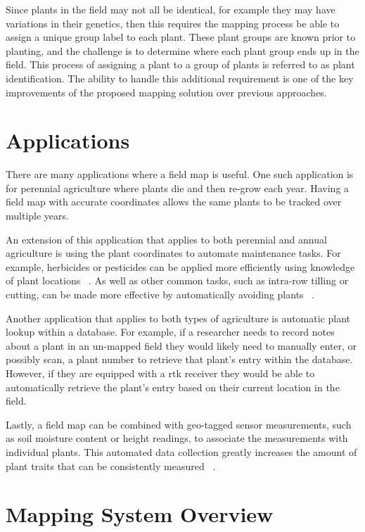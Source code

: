 Since plants in the field may not all be identical, for example they may have variations in their genetics, then this requires the mapping process be able to assign a unique group label to each plant.  These plant groups are known prior to planting, and the challenge is to determine where each plant group ends up in the field.  This process of assigning a plant to a group of plants is referred to as plant identification. The ability to handle this additional requirement is one of the key improvements of the proposed mapping solution over previous approaches.

\section{Applications}

There are many applications where a field map is useful.  One such application is for perennial agriculture where plants die and then re-grow each year.  Having a field map with accurate coordinates allows the same plants to be tracked over multiple years.

An extension of this application that applies to both perennial and annual agriculture is using the plant coordinates to automate maintenance tasks.  For example, herbicides or pesticides can be applied more efficiently using knowledge of plant locations ~\citep{Carballido:2013}. As well as other common tasks, such as intra-row tilling or cutting, can be made more effective by automatically avoiding plants ~\citep{Bakker:2010}.  

Another application that applies to both types of agriculture is automatic plant lookup within a database.  For example, if a researcher needs to record notes about a plant in an un-mapped field they would likely need to manually enter, or possibly scan, a plant number to retrieve that plant's entry within the database.  However, if they are equipped with a \ac{rtk} receiver they would be able to automatically retrieve the plant's entry based on their current location in the field. 

Lastly, a field map can be combined with geo-tagged sensor measurements, such as soil moisture content or height readings, to associate the measurements with individual plants.  This automated data collection greatly increases the amount of plant traits that can be consistently measured ~\citep{Ruckelshausen:2009}.

\section{Mapping System Overview} 

